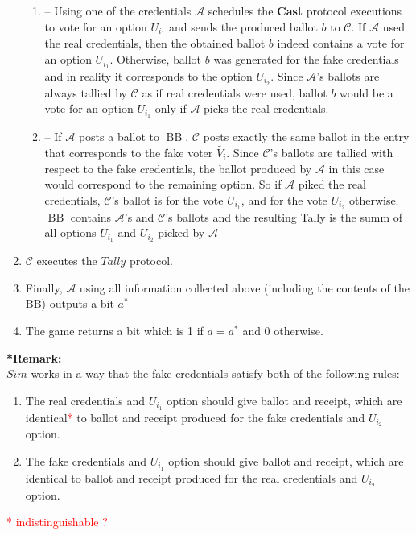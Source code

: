 \documentclass[12pt]{article}
\DeclareMathOperator{\bb}{BB}
\begin{document}
\begin{enumerate}
\begin{enumerate}
 \item[] -- Using one of the credentials $\mathcal{A}$ schedules the \textbf{Cast} protocol executions to vote for an option $U_{i_1}$ and sends the produced ballot $b$ to $\mathcal{C}$. If  $\mathcal{A}$ used the real credentials, then the obtained ballot $b$ indeed contains a vote for an option  $U_{i_1}$. Otherwise, ballot $b$ was generated for the fake credentials and in reality it corresponds to the option $U_{i_2}$. Since $\mathcal{A}$'s ballots are always tallied by $\mathcal{C}$ as if real credentials  were used, ballot  $b$ would be a vote for an option $U_{i_1}$ only if  $\mathcal{A}$ picks the real credentials. 
\item[] --  If  $\mathcal{A}$ posts a ballot to $\bb$, $\mathcal{C}$ posts exactly the same ballot in the entry that corresponds to the fake voter $\tilde{V_i}$. Since $\mathcal{C}$'s ballots are tallied with respect to the fake credentials, the ballot produced by $\mathcal{A}$ in this case would correspond to the remaining option. So if  $\mathcal{A}$ piked the real credentials, $\mathcal{C}$'s ballot is for the vote   $U_{i_1}$, and for the vote  $U_{i_2}$ otherwise. $\bb$ contains $\mathcal{A}$'s and $\mathcal{C}$'s ballots and the resulting Tally is the summ of all options    $U_{i_1}$ and  $U_{i_2}$ picked by  $\mathcal{A}$
\end{enumerate}
\item  $\mathcal{C}$ executes the $Tally$ protocol.  
\item Finally, $\mathcal{A}$ using all information collected above (including the contents of the BB) outputs a bit $a^*$
\item The game returns a bit which is 1 if $a = a^*$ and 0 otherwise.
\end{enumerate}
\textbf{*Remark:}\\
$Sim$ works in a way that the fake credentials satisfy both of the following rules: 
\begin{enumerate}
 \item The real credentials and $U_{i_1}$ option  should give ballot and receipt, which are identical\textcolor{red}{*} to ballot and receipt produced for the fake credentials and  $U_{i_2}$ option.
 \item The fake credentials and $U_{i_1}$ option  should give ballot and receipt, which are identical to ballot and receipt produced for the real credentials and  $U_{i_2}$ option.
 \end{enumerate}
\textcolor{red}{*  indistinguishable ?}\\\\
\end{document}
